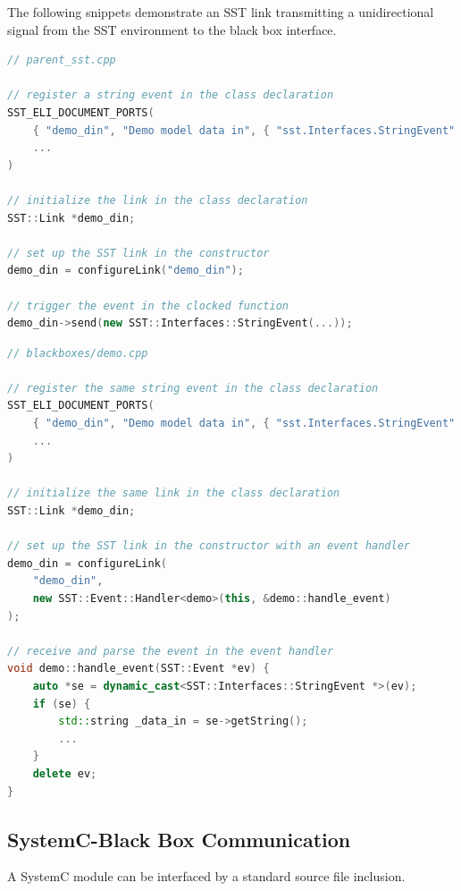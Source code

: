 \documentclass{article}
\begin{document}
    The following snippets demonstrate an SST link transmitting a unidirectional signal from the SST environment to the black box interface.

\begin{lstlisting}[language=C++]
// parent_sst.cpp

// register a string event in the class declaration
SST_ELI_DOCUMENT_PORTS(
    { "demo_din", "Demo model data in", { "sst.Interfaces.StringEvent" }},
    ...
)

// initialize the link in the class declaration
SST::Link *demo_din;

// set up the SST link in the constructor
demo_din = configureLink("demo_din");

// trigger the event in the clocked function
demo_din->send(new SST::Interfaces::StringEvent(...));
\end{lstlisting}

\begin{lstlisting}[language=C++]
// blackboxes/demo.cpp

// register the same string event in the class declaration
SST_ELI_DOCUMENT_PORTS(
    { "demo_din", "Demo model data in", { "sst.Interfaces.StringEvent" }},
    ...
)

// initialize the same link in the class declaration
SST::Link *demo_din;

// set up the SST link in the constructor with an event handler
demo_din = configureLink(
    "demo_din",
    new SST::Event::Handler<demo>(this, &demo::handle_event)
);

// receive and parse the event in the event handler
void demo::handle_event(SST::Event *ev) {
    auto *se = dynamic_cast<SST::Interfaces::StringEvent *>(ev);
    if (se) {
        std::string _data_in = se->getString();
        ...
    }
    delete ev;
}
\end{lstlisting}

    \subsection{SystemC-Black Box Communication}
    A SystemC module can be interfaced by a standard source file inclusion.
\end{document}

